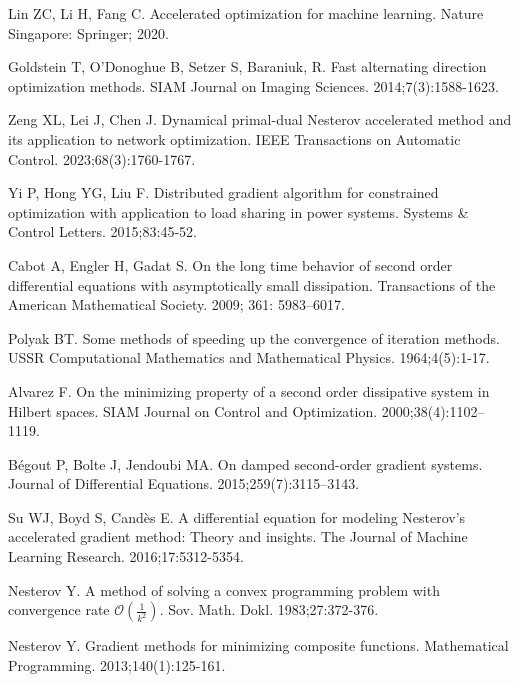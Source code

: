 \documentclass[review]{elsarticle}
\begin{document}
	\begin{thebibliography}{}
		
		Lin ZC, Li H, Fang C. Accelerated optimization for machine learning. Nature Singapore: Springer; 2020.
		
		Goldstein T, O'Donoghue B, Setzer S, Baraniuk, R. Fast alternating direction optimization methods. SIAM Journal on Imaging Sciences. 2014;7(3):1588-1623.	
		
		Zeng XL, Lei J, Chen J. Dynamical primal-dual Nesterov accelerated method and its application to network optimization. IEEE Transactions on Automatic Control. 2023;68(3):1760-1767.	
		
		Yi P, Hong YG, Liu F. Distributed gradient algorithm for constrained optimization with application to load sharing in power systems. Systems \& Control Letters. 2015;83:45-52.
		
           Cabot A,  Engler H,  Gadat S. On the long time behavior of second order differential equations with asymptotically small dissipation. Transactions of the American Mathematical Society.  2009; 361: 5983–6017.
		
		Polyak BT. Some methods of speeding up the convergence of iteration methods. USSR Computational Mathematics and Mathematical Physics. 1964;4(5):1-17.
		
		Alvarez F. On the minimizing property of a second order dissipative system in Hilbert spaces. SIAM Journal on  Control and Optimization. 2000;38(4):1102–1119.
		
		B{\'e}gout P, Bolte J, Jendoubi MA. On damped second-order gradient systems. Journal of Differential Equations.  2015;259(7):3115–3143.
		
		Su WJ, Boyd S, Cand{\`e}s E. A differential equation for modeling Nesterov’s accelerated gradient method: Theory and insights. The Journal of Machine Learning Research. 2016;17:5312-5354.


		Nesterov Y. A method of solving a convex programming problem with convergence rate $\mathcal{O}(\frac{1}{k^2})$. Sov. Math. Dokl. 1983;27:372-376.
		
		Nesterov Y. Gradient methods for minimizing composite functions. Mathematical Programming. 2013;140(1):125-161.


\end{thebibliography}
\end{document}
